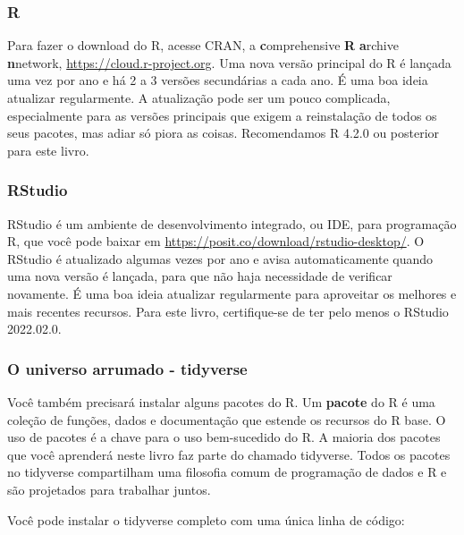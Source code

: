 \documentclass[
]{article}
\begin{document}
\hypertarget{r}{%
\subsubsection*{R}\label{r}}

Para fazer o download do R, acesse CRAN, a \textbf{c}omprehensive \textbf{R} \textbf{a}rchive \textbf{n}network, \url{https://cloud.r-project.org}.
Uma nova versão principal do R é lançada uma vez por ano e há 2 a 3 versões secundárias a cada ano.
É uma boa ideia atualizar regularmente.
A atualização pode ser um pouco complicada, especialmente para as versões principais que exigem a reinstalação de todos os seus pacotes, mas adiar só piora as coisas.
Recomendamos R 4.2.0 ou posterior para este livro.

\hypertarget{rstudio}{%
\subsubsection*{RStudio}\label{rstudio}}

RStudio é um ambiente de desenvolvimento integrado, ou IDE, para programação R, que você pode baixar em \url{https://posit.co/download/rstudio-desktop/}.
O RStudio é atualizado algumas vezes por ano e avisa automaticamente quando uma nova versão é lançada, para que não haja necessidade de verificar novamente.
É uma boa ideia atualizar regularmente para aproveitar os melhores e mais recentes recursos.
Para este livro, certifique-se de ter pelo menos o RStudio 2022.02.0.

\hypertarget{o-universo-arrumado---tidyverse}{%
\subsubsection*{O universo arrumado - tidyverse}\label{o-universo-arrumado---tidyverse}}

Você também precisará instalar alguns pacotes do R.
Um \textbf{pacote} do R é uma coleção de funções, dados e documentação que estende os recursos do R base.
O uso de pacotes é a chave para o uso bem-sucedido do R.
A maioria dos pacotes que você aprenderá neste livro faz parte do chamado tidyverse.
Todos os pacotes no tidyverse compartilham uma filosofia comum de programação de dados e R e são projetados para trabalhar juntos.

Você pode instalar o tidyverse completo com uma única linha de código:
\end{document}
